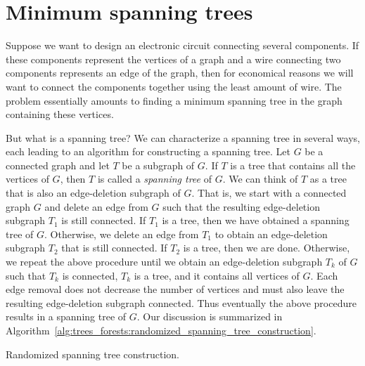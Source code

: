 
\section{Minimum spanning trees}
\label{sec:trees_forests:minimum_spanning_trees}

Suppose we want to design an electronic
circuit connecting several components. If
these components represent the vertices of a graph and a wire
connecting two components represents an edge of the graph, then for
economical reasons we will want to connect the components together
using the least amount of wire. The problem essentially amounts to
finding a minimum spanning tree in the
graph containing these vertices.

But what is a spanning tree? We can characterize
a spanning tree in several ways, each leading to
an algorithm for constructing a spanning
tree. Let $G$ be a connected graph and let $T$ be a subgraph of
$G$. If $T$ is a tree that contains all the vertices of $G$, then $T$
is called a \emph{spanning tree} of $G$. We can
think of $T$ as a tree that is also an
edge-deletion subgraph of $G$. That is,
we start with a connected graph $G$ and delete an edge from $G$ such
that the resulting edge-deletion
subgraph $T_1$ is still connected. If $T_1$ is a tree, then we have
obtained a spanning tree of $G$. Otherwise, we
delete an edge from $T_1$ to obtain an
edge-deletion subgraph $T_2$ that is
still connected. If $T_2$ is a tree, then we are done. Otherwise, we
repeat the above procedure until we obtain an
edge-deletion subgraph $T_k$ of $G$ such
that $T_k$ is connected, $T_k$ is a tree, and it contains all vertices
of $G$. Each edge removal does not decrease the number of vertices and
must also leave the resulting
edge-deletion subgraph connected. Thus
eventually the above procedure results in a
spanning tree of $G$. Our discussion is
summarized in
Algorithm~\ref{alg:trees_forests:randomized_spanning_tree_construction}.

\begin{algorithm}[!htbp]

\caption{Randomized spanning tree construction.}
\label{alg:trees_forests:randomized_spanning_tree_construction}
\end{algorithm}

